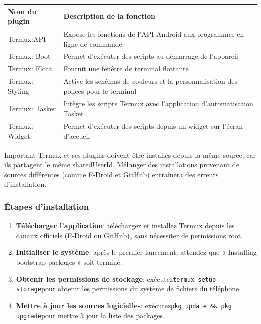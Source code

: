 \begin{center}
\begin{tabularx}{\linewidth}{|X|X|}
\hline
\textbf{Nom du plugin} & \textbf{Description de la fonction} \tabularnewline
\hline
Termux:API & Expose les fonctions de l'API Android aux programmes en ligne de commande \tabularnewline
Termux: Boot & Permet d'exécuter des scripts au démarrage de l'appareil \tabularnewline
Termux: Float & Fournit une fenêtre de terminal flottante \tabularnewline
Termux: Styling & Active les schémas de couleurs et la personnalisation des polices pour le terminal \tabularnewline
Termux: Tasker & Intègre les scripts Termux avec l'application d'automatisation Tasker \tabularnewline
Termux: Widget & Permet d'exécuter des scripts depuis un widget sur l'écran d'accueil \tabularnewline
\hline
\end{tabularx}
\end{center}

\begin{tcbwarn}{Important}
Termux et ses plugins doivent être installés depuis la même source, car ils partagent le même sharedUserId. Mélanger des installations provenant de sources différentes (comme F-Droid et GitHub) entraînera des erreurs d'installation.

\end{tcbwarn}


\subsubsection*{Étapes d'installation}

\begin{enumerate}
  \item \textbf{Télécharger l'application}: téléchargez et installez Termux depuis les canaux officiels (F-Droid ou GitHub), sans nécessiter de permissions root.
  \item \textbf{Initialiser le système}: après le premier lancement, attendez que « Installing bootstrap packages » soit terminé.
  \item \textbf{Obtenir les permissions de stockage}: exécutez\texttt{termux-\allowbreak setup-\allowbreak storage}pour obtenir les permissions du système de fichiers du téléphone.
  \item \textbf{Mettre à jour les sources logicielles}: exécutez\texttt{pkg update \&\& pkg upgrade}pour mettre à jour la liste des packages.
\end{enumerate}

